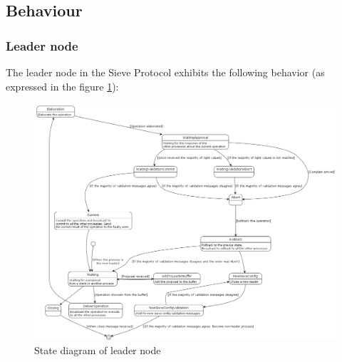 \documentclass{scrartcl}
\begin{document}
\subsection{Behaviour}

\subsubsection{Leader node}

%


The leader node in the Sieve Protocol exhibits the following behavior (as expressed in the figure \ref{fig:leader}):
\begin{figure}[H]
    \centering
    \includegraphics[width=1\linewidth]{figures/leader.png}
    \caption{State diagram of leader node}
    \label{fig:leader} 
\end{figure}
\end{document}
